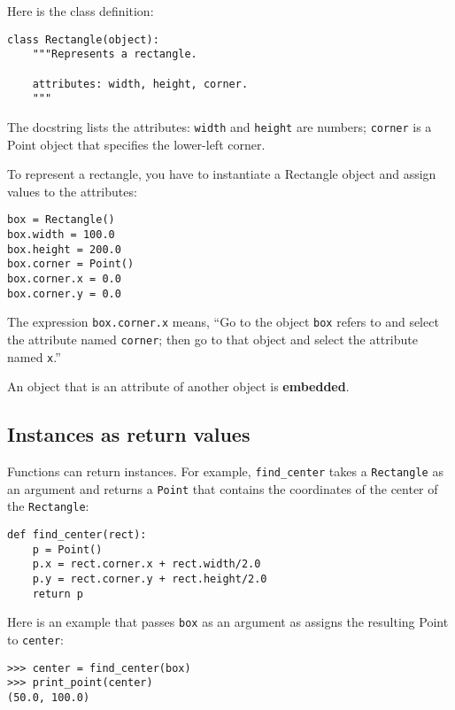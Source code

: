 \documentclass{article}
\begin{document}
Here is the class definition:
\begin{verbatim}
class Rectangle(object):
    """Represents a rectangle.

    attributes: width, height, corner.
    """
\end{verbatim}
The docstring lists the attributes: \verb|width| and \verb|height| are
numbers; \verb|corner| is a Point object that specifies the lower-left
corner.

To represent a rectangle, you have to instantiate a Rectangle object and
assign values to the attributes:
\begin{verbatim}
box = Rectangle()
box.width = 100.0
box.height = 200.0
box.corner = Point()
box.corner.x = 0.0
box.corner.y = 0.0
\end{verbatim}
The expression \verb|box.corner.x| means, ``Go to the object \verb|box|
refers to and select the attribute named \verb|corner|; then go to that
object and select the attribute named \verb|x|.''

An object that is an attribute of another object is \textbf{embedded}.

\subsection{Instances as return values}
Functions can return instances. For example, \verb|find_center| takes a
\verb|Rectangle| as an argument and returns a \verb|Point| that contains
the coordinates of the center of the \verb|Rectangle|:
\begin{verbatim}
def find_center(rect):
    p = Point()
    p.x = rect.corner.x + rect.width/2.0
    p.y = rect.corner.y + rect.height/2.0
    return p
\end{verbatim}
Here is an example that passes \verb|box| as an argument as assigns the
resulting Point to \verb|center|:
\begin{verbatim}
>>> center = find_center(box)
>>> print_point(center)
(50.0, 100.0)
\end{verbatim}
\end{document}
